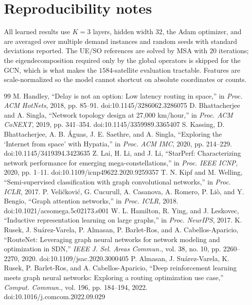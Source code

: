 \documentclass[journal]{IEEEtran}
\begin{document}
\appendices
\section{Reproducibility notes}
All learned results use $K{=}3$ layers, hidden width $32$, the Adam optimizer, and are
averaged over multiple demand instances and random seeds with standard deviations
reported. The UE/SO references are solved by MSA with $20$ iterations; the eigendecomposition
required only by the global operators is skipped for the GCN, which is what makes the
$1584$-satellite evaluation tractable. Features are scale-normalized so the model cannot
shortcut on absolute coordinates or counts.

\begin{thebibliography}{99}
 M. Handley, ``Delay is not an option: Low latency routing in
space,'' in \emph{Proc. ACM HotNets}, 2018, pp. 85--91. doi:10.1145/3286062.3286075
 D. Bhattacherjee and A. Singla, ``Network topology
design at 27,000 km/hour,'' in \emph{Proc. ACM CoNEXT}, 2019, pp. 341--354. doi:10.1145/3359989.3365407
 S. Kassing, D. Bhattacherjee, A. B. Águas, J. E. Saethre, and
A. Singla, ``Exploring the `Internet from space' with Hypatia,'' in \emph{Proc. ACM
IMC}, 2020, pp. 214--229. doi:10.1145/3419394.3423635
 Z. Lai, H. Li, and J. Li, ``StarPerf: Characterizing network
performance for emerging mega-constellations,'' in \emph{Proc. IEEE ICNP}, 2020, pp. 1--11. doi:10.1109/icnp49622.2020.9259357
 T. N. Kipf and M. Welling, ``Semi-supervised classification with graph
convolutional networks,'' in \emph{Proc. ICLR}, 2017.
 P. Veli\v{c}kovi\'c, G. Cucurull, A. Casanova, A. Romero, P. Li\`o, and
Y. Bengio, ``Graph attention networks,'' in \emph{Proc. ICLR}, 2018. doi:10.1021/acsomega.5c02173.s001
 W. L. Hamilton, R. Ying, and J. Leskovec, ``Inductive
representation learning on large graphs,'' in \emph{Proc. NeurIPS}, 2017.
 K. Rusek, J. Su\'arez-Varela, P. Almasan, P. Barlet-Ros, and
A. Cabellos-Aparicio, ``RouteNet: Leveraging graph neural networks for network modeling
and optimization in SDN,'' \emph{IEEE J. Sel. Areas Commun.}, vol. 38, no. 10,
pp. 2260--2270, 2020. doi:10.1109/jsac.2020.3000405
 P. Almasan, J. Su\'arez-Varela, K. Rusek, P. Barlet-Ros, and
A. Cabellos-Aparicio, ``Deep reinforcement learning meets graph neural networks:
Exploring a routing optimization use case,'' \emph{Comput. Commun.}, vol. 196,
pp. 184--194, 2022. doi:10.1016/j.comcom.2022.09.029

\end{thebibliography}
\end{document}
